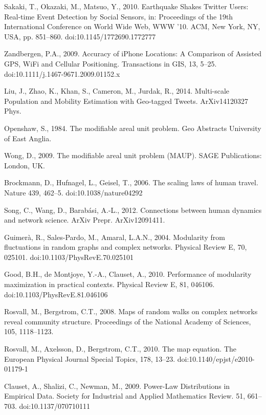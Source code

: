 \documentclass[10pt,letterpaper]{article}
\begin{document}
\begin{thebibliography}{10}
Sakaki, T., Okazaki, M., Matsuo, Y., 2010. Earthquake Shakes Twitter Users: Real-time Event Detection by Social Sensors, in: Proceedings of the 19th International Conference on World Wide Web, WWW ’10. ACM, New York, NY, USA, pp. 851–860. doi:10.1145/1772690.1772777

Zandbergen, P.A., 2009. Accuracy of iPhone Locations: A Comparison of Assisted GPS, WiFi and Cellular Positioning. Transactions in GIS, 13, 5–25. doi:10.1111/j.1467-9671.2009.01152.x

Liu, J., Zhao, K., Khan, S., Cameron, M., Jurdak, R., 2014. Multi-scale Population and Mobility Estimation with Geo-tagged Tweets. ArXiv14120327 Phys.

Openshaw, S., 1984. The modifiable areal unit problem. Geo Abstracts University of East Anglia.

Wong, D., 2009. The modifiable areal unit problem (MAUP). SAGE Publications: London, UK.

Brockmann, D., Hufnagel, L., Geisel, T., 2006. The scaling laws of human travel. Nature 439, 462–5. doi:10.1038/nature04292

Song, C., Wang, D., Barabási, A.-L., 2012. Connections between human dynamics and network science. ArXiv Prepr. ArXiv12091411.

Guimerà, R., Sales-Pardo, M., Amaral, L.A.N., 2004. Modularity from fluctuations in random graphs and complex networks. Physical Review E, 70, 025101. doi:10.1103/PhysRevE.70.025101

Good, B.H., de Montjoye, Y.-A., Clauset, A., 2010. Performance of modularity maximization in practical contexts. Physical Review E, 81, 046106. doi:10.1103/PhysRevE.81.046106

Rosvall, M., Bergstrom, C.T., 2008. Maps of random walks on complex networks reveal community structure. Proceedings of the National Academy of Sciences, 105, 1118–1123.

Rosvall, M., Axelsson, D., Bergstrom, C.T., 2010. The map equation. The European Physical Journal Special Topics, 178, 13–23. doi:10.1140/epjst/e2010-01179-1

Clauset, A., Shalizi, C., Newman, M., 2009. Power-Law Distributions in Empirical Data. Society for Industrial and Applied Mathematics Review. 51, 661–703. doi:10.1137/070710111



\end{thebibliography}
\end{document}
